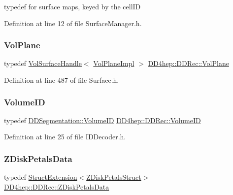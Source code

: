 typedef for surface maps, keyed by the cell\+ID 



Definition at line 12 of file Surface\+Manager.\+h.

\hypertarget{namespace_d_d4hep_1_1_d_d_rec_a6d192b28d640c45adbaa4d1ae9fb18b9}{}\label{namespace_d_d4hep_1_1_d_d_rec_a6d192b28d640c45adbaa4d1ae9fb18b9} 
\subsubsection{\texorpdfstring{Vol\+Plane}{VolPlane}}
{\footnotesize\ttfamily typedef \hyperlink{class_d_d4hep_1_1_d_d_rec_1_1_vol_surface_handle}{Vol\+Surface\+Handle}$<$ \hyperlink{class_d_d4hep_1_1_d_d_rec_1_1_vol_plane_impl}{Vol\+Plane\+Impl} $>$ \hyperlink{namespace_d_d4hep_1_1_d_d_rec_a6d192b28d640c45adbaa4d1ae9fb18b9}{D\+D4hep\+::\+D\+D\+Rec\+::\+Vol\+Plane}}



Definition at line 487 of file Surface.\+h.

\hypertarget{namespace_d_d4hep_1_1_d_d_rec_a5b5fea15b3678944e1aba487a746bdcb}{}\label{namespace_d_d4hep_1_1_d_d_rec_a5b5fea15b3678944e1aba487a746bdcb} 
\subsubsection{\texorpdfstring{Volume\+ID}{VolumeID}}
{\footnotesize\ttfamily typedef \hyperlink{namespace_d_d4hep_1_1_d_d_segmentation_a61a6833a18d1800bdef176595f83e3ba}{D\+D\+Segmentation\+::\+Volume\+ID} \hyperlink{namespace_d_d4hep_1_1_d_d_rec_a5b5fea15b3678944e1aba487a746bdcb}{D\+D4hep\+::\+D\+D\+Rec\+::\+Volume\+ID}}



Definition at line 25 of file I\+D\+Decoder.\+h.

\hypertarget{namespace_d_d4hep_1_1_d_d_rec_a589fa302569ee79d91b34ff0d97d4a78}{}\label{namespace_d_d4hep_1_1_d_d_rec_a589fa302569ee79d91b34ff0d97d4a78} 
\subsubsection{\texorpdfstring{Z\+Disk\+Petals\+Data}{ZDiskPetalsData}}
{\footnotesize\ttfamily typedef \hyperlink{struct_d_d4hep_1_1_d_d_rec_1_1_struct_extension}{Struct\+Extension}$<$\hyperlink{struct_d_d4hep_1_1_d_d_rec_1_1_z_disk_petals_struct}{Z\+Disk\+Petals\+Struct}$>$ \hyperlink{namespace_d_d4hep_1_1_d_d_rec_a589fa302569ee79d91b34ff0d97d4a78}{D\+D4hep\+::\+D\+D\+Rec\+::\+Z\+Disk\+Petals\+Data}}



